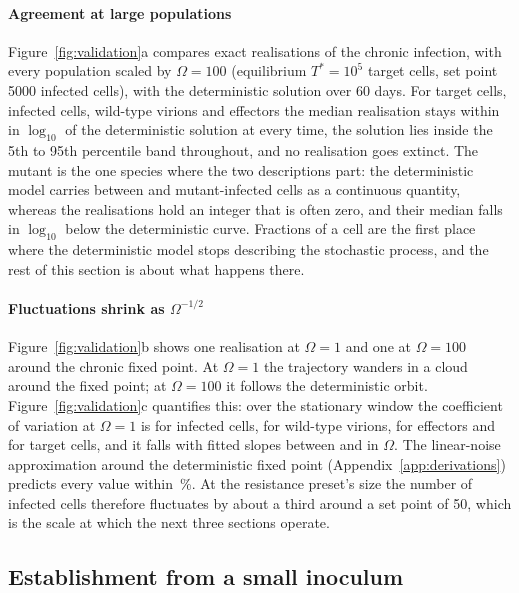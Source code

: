 \paragraph{Agreement at large populations}
Figure~\ref{fig:validation}a compares \BaselineN{} exact realisations of the chronic infection, with every population scaled by $\Omega = 100$ (equilibrium $T^* = 10^5$ target cells, set point 5000 infected cells), with the deterministic solution over 60 days. For target cells, infected cells, wild-type virions and effectors the median realisation stays within \BaselineMaxLogDev{} in $\log_{10}$ of the deterministic solution at every time, the solution lies inside the 5th to 95th percentile band throughout, and no realisation goes extinct. The mutant is the one species where the two descriptions part: the deterministic model carries between \BaselineMutMin{} and \BaselineMutMax{} mutant-infected cells as a continuous quantity, whereas the realisations hold an integer that is often zero, and their median falls \BaselineMutLogDev{} in $\log_{10}$ below the deterministic curve. Fractions of a cell are the first place where the deterministic model stops describing the stochastic process, and the rest of this section is about what happens there.

\paragraph{Fluctuations shrink as $\Omega^{-1/2}$}
Figure~\ref{fig:validation}b shows one realisation at $\Omega = 1$ and one at $\Omega = 100$ around the chronic fixed point. At $\Omega = 1$ the trajectory wanders in a cloud around the fixed point; at $\Omega = 100$ it follows the deterministic orbit. Figure~\ref{fig:validation}c quantifies this: over the stationary window the coefficient of variation at $\Omega = 1$ is \CvIwOne{} for infected cells, \CvVwOne{} for wild-type virions, \CvEOne{} for effectors and \CvTOne{} for target cells, and it falls with fitted slopes between \CvSlopeMin{} and \CvSlopeMax{} in $\Omega$. The linear-noise approximation around the deterministic fixed point (Appendix~\ref{app:derivations}) predicts every value within \CvMaxRelDev\,\%. At the resistance preset's size the number of infected cells therefore fluctuates by about a third around a set point of 50, which is the scale at which the next three sections operate.

\subsection{Establishment from a small inoculum}
\label{sec:establishment}

